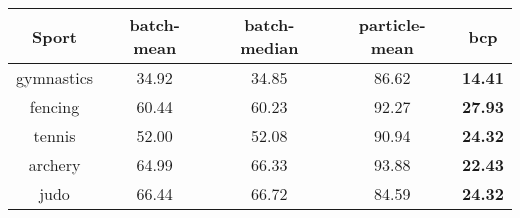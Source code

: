 \begin{tabular}{|c|c|c|c|c|}
\hline
Sport & batch-mean & batch-median & particle-mean & bcp \\
\hline
gymnastics & 34.92 & 34.85 & 86.62 & \textbf{14.41} \\
fencing & 60.44 & 60.23 & 92.27 & \textbf{27.93} \\
tennis & 52.00 & 52.08 & 90.94 & \textbf{24.32} \\
archery & 64.99 & 66.33 & 93.88 & \textbf{22.43} \\
judo & 66.44 & 66.72 & 84.59 & \textbf{24.32} \\
\hline
\end{tabular}

